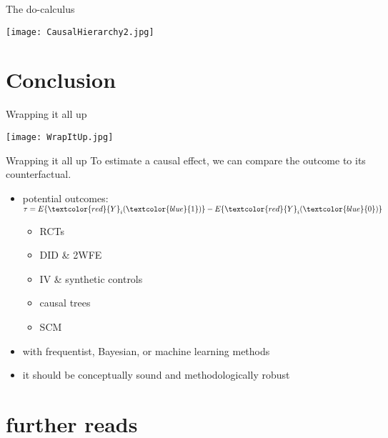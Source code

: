 \documentclass[aspectratio=169]{beamer}
\begin{document}
		\begin{frame}{The do-calculus}
			\begin{center}
				\texttt{[image: CausalHierarchy2.jpg]}
			\end{center}
		\end{frame}

\section{Conclusion}


	\begin{frame}{Wrapping it all up}
		\begin{center}
			\texttt{[image: WrapItUp.jpg]}
		\end{center}
	\end{frame}

	\begin{frame}{Wrapping it all up}
		To estimate a causal effect, we can compare the outcome to its counterfactual.
		\begin{itemize}
			\item<1-> potential outcomes: $ \tau  =  E \{\textcolor{red}{Y}_i(\textcolor{blue}{1})\} - E \{\textcolor{red}{Y}_i(\textcolor{blue}{0})\} $
			\begin{itemize}
				\item<2-> RCTs
				\item<2-> DID \& 2WFE
				\item<2-> IV \& synthetic controls
				\item<2-> causal trees
				\item<2->	SCM
			\end{itemize}
			\item<3-> with frequentist, Bayesian, or machine learning methods
			\item<4-> it should be conceptually sound and methodologically robust
		\end{itemize}
	\end{frame}

\section{further reads}
\end{document}

